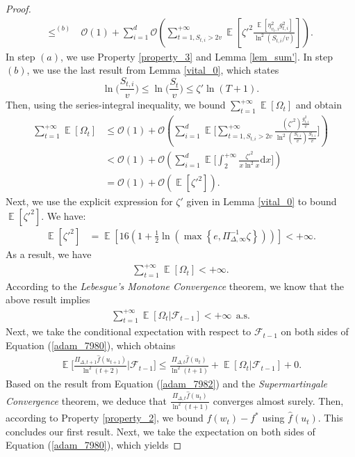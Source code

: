 \documentclass{article} %
\DeclareMathOperator{\Expect}{\mathbb{E}}
\begin{document}
\begin{proof}
\begin{align*}
\mathop{\le}^{(b)} &\ \mathcal{O}(1)+\sum_{i=1}^{d}\mathcal{O}\left(\sum_{t=1,S_{t,i}>2v}^{+\infty}\Expect\left[\zeta'^{2}\frac{\Expect[\eta_{v_{t},i}^{2}g_{t,i}^{2}]}{\ln^{2}\left(S_{t,i}/v\right)}\right]\right).
\end{align*}
In step $(a)$, we use Property \ref{property_3} and Lemma \ref{lem_sum'}. In step $(b)$, we use the last result from Lemma \ref{vital_0}, which states
$$\ln\Big(\frac{S_{t,i}}{v}\Big)\le\ln\Big(\frac{S_{t}}{v}\Big)\le \zeta'\ln (T+1).$$ Then, using the series-integral inequality, we bound $\sum_{t=1}^{+\infty} \Expect[\Omega_{t}]$ and obtain
\begin{align*}
    \sum_{t=1}^{+\infty}\Expect[\Omega_{t}]&\le \mathcal{O}(1)+\mathcal{O}\left(\sum_{i=1}^{d}\Expect\bigg[\sum_{t=1,S_{t,i}>2v}^{+\infty}\frac{({\zeta'}^{2})\frac{g_{t,i}^{2}}{v}}{\ln^{2}(\frac{S_{t,i}}{v})\frac{S_{t,i}}{v}}\bigg]\right)\\
    & <\mathcal{O}(1)+\mathcal{O}\left(\sum_{i=1}^{d}\Expect\Bigg[\int_{2}^{+\infty}\frac{{\zeta'}^{2}}{x\ln^{2}x}\text{d}x\Bigg]\right)\\&=\mathcal{O}(1)+\mathcal{O}(\Expect[\zeta'^{2}]).
\end{align*}
Next, we use the explicit expression for $\zeta'$ given in Lemma \ref{vital_0} to bound $\Expect[{\zeta'}^{2}]$. We have:
\begin{align*}
\Expect[{\zeta'}^{2}]&=\Expect\left[16\left(1+\frac{1}{2}{\ln\left(\max\left\{e,\Pi_{\Delta,\infty}^{-1}\zeta\right\}\right)}\right)\right]<+\infty.
\end{align*}
As a result, we have
\begin{align}\label{adam_7981}
     \sum_{t=1}^{+\infty}\Expect[\Omega_{t}]<+\infty.
\end{align}
According to the \emph{Lebesgue's Monotone Convergence} theorem, we know that the above result implies
\begin{align}\label{adam_7982}
\sum_{t=1}^{+\infty}\Expect[\Omega_{t}|\mathscr{F}_{t-1}]<+\infty\ \ \text{a.s.}
\end{align}
Next, we take the conditional expectation with respect to $\mathscr{F}_{t-1}$ on both sides of Equation (\ref{adam_7980}), which obtains
\begin{align}\label{adam_7980'}
\Expect\Bigg[\frac{\Pi_{\Delta,t+1}\hat{f}(u_{t+1})}{\ln^{2}(t+2)}\Bigg|\mathscr{F}_{t-1}\Bigg]\le \frac{\Pi_{\Delta,t}\hat{f}(u_{t})}{\ln^{2}(t+1)}+\Expect[{\Omega_{t}}|\mathscr{F}_{t-1}]+0.
\end{align}
Based on the result from Equation (\ref{adam_7982}) and the \emph{Supermartingale Convergence} theorem, we deduce that $\frac{\Pi_{\Delta,t}\hat{f}(u_{t})}{\ln^{2}(t+1)}$ converges almost surely. Then, according to Property \ref{property_2}, we bound ${f}(w_{t})-f^*$ using $\hat{f}(u_{t}).$ This concludes our first result. Next, we take the expectation on both sides of Equation (\ref{adam_7980}), which yields

\end{proof}
\end{document}
